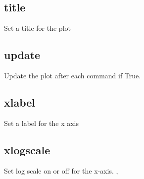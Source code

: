 \documentclass[letterpaper,10pt,english]{sphinxmanual}
\begin{document}
\begin{sphinxVerbatim}[commandchars=\\\{\}]
\PYG{p}{[}\PYG{p}{]}    
\end{sphinxVerbatim}


\subsection{title}
\label{\detokenize{plot_control_cmds:title}}
Set a title for the plot

\begin{sphinxVerbatim}[commandchars=\\\{\}]
\PYG{p}{[}\PYG{p}{]}  
\end{sphinxVerbatim}


\subsection{update}
\label{\detokenize{plot_control_cmds:update}}
Update the plot after each command if True.

\begin{sphinxVerbatim}[commandchars=\\\{\}]
\PYG{p}{[}\PYG{p}{]}    
\end{sphinxVerbatim}


\subsection{xlabel}
\label{\detokenize{plot_control_cmds:xlabel}}
Set a label for the x axis

\begin{sphinxVerbatim}[commandchars=\\\{\}]
\PYG{p}{[}\PYG{p}{]}  
\end{sphinxVerbatim}


\subsection{xlogscale}
\label{\detokenize{plot_control_cmds:xlogscale}}
Set log scale on or off for the x-axis. , 
\end{document}

